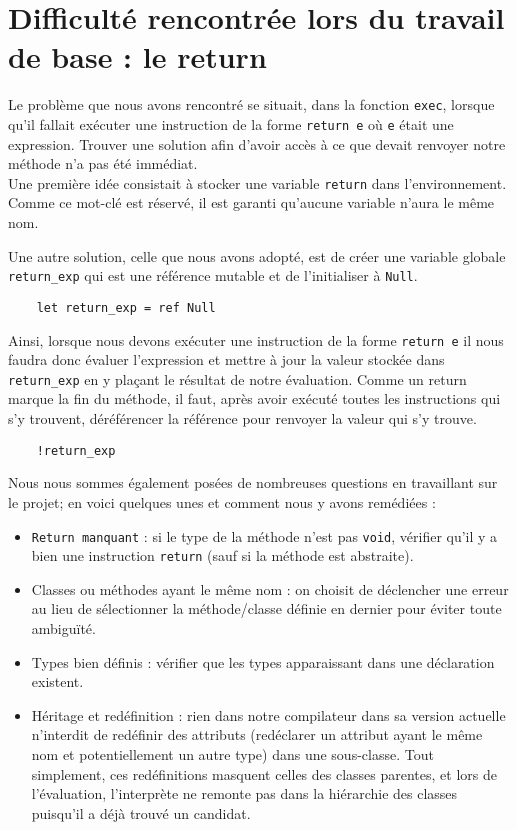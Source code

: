 \documentclass{article}
\begin{document}
\section{Difficulté rencontrée lors du travail de base : le return}
Le problème que nous avons rencontré se situait, dans la fonction \texttt{exec}, lorsque qu'il fallait exécuter une instruction de la forme \texttt{return e} où \texttt{e} était une expression. 
Trouver une solution afin d'avoir accès à ce que devait renvoyer notre méthode n'a pas été immédiat.\\
Une première idée consistait à stocker une variable \texttt{return} dans l'environnement. Comme ce mot-clé est réservé, 
il est garanti qu'aucune variable n'aura le même nom.

Une autre solution, celle que nous avons adopté, est de créer une variable globale \texttt{return\_exp} qui est une référence mutable et de  l'initialiser à \texttt{Null}.
\begin{verbatim}
    let return_exp = ref Null
\end{verbatim}
Ainsi, lorsque nous devons exécuter une instruction de la forme \texttt{return e} il nous faudra donc évaluer l'expression et mettre à jour la valeur stockée dans \texttt{return\_exp} en y plaçant le résultat de notre évaluation. Comme un return marque la fin du méthode, il faut, après avoir exécuté toutes les instructions qui s'y trouvent, déréférencer la référence pour renvoyer la valeur qui s'y trouve.
\begin{verbatim}
    !return_exp
\end{verbatim}

Nous nous sommes également posées de nombreuses questions en travaillant sur le projet; en voici quelques unes et comment nous y avons remédiées :
\begin{itemize}
    \item \texttt{Return manquant} : si le type de la méthode n'est pas \texttt{void}, vérifier qu'il y a bien une instruction \texttt{return} (sauf si la méthode est abstraite).
    \item Classes ou méthodes ayant le même nom : on choisit de déclencher une erreur au lieu de sélectionner la méthode/classe définie en dernier pour éviter toute ambiguïté.
    \item Types bien définis : vérifier que les types apparaissant dans une déclaration existent.
    \item Héritage et redéfinition : rien dans notre compilateur dans sa version actuelle n'interdit de redéfinir des attributs (redéclarer un attribut ayant le même nom et potentiellement un autre type) dans une sous-classe. Tout simplement, ces redéfinitions masquent celles des classes parentes, et lors de l'évaluation, l'interprète ne remonte pas dans la hiérarchie des classes puisqu'il a déjà trouvé un candidat.
\end{itemize}
\end{document}
